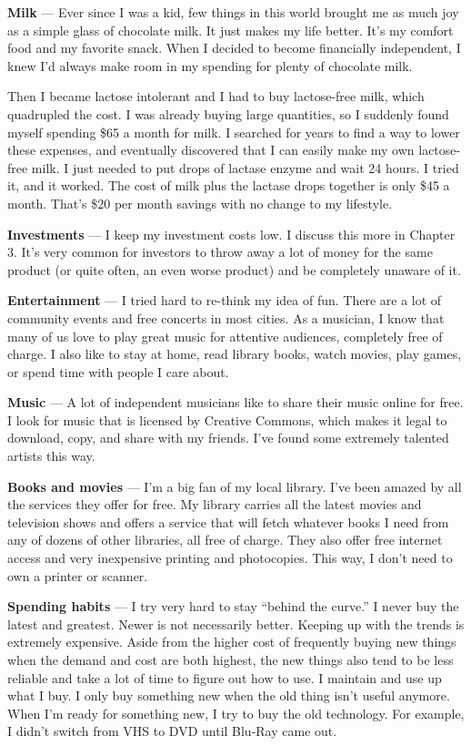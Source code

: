 \textbf{Milk} --- Ever since I was a kid, few things in this world brought me as much joy as a simple glass of chocolate milk. It just makes my life better. It's my comfort food and my favorite snack. When I decided to become financially independent, I knew I'd always make room in my spending for plenty of chocolate milk.

Then I became lactose intolerant and I had to buy lactose-free milk, which quadrupled the cost. I was already buying large quantities, so I suddenly found myself spending \$65 a month for milk. I searched for years to find a way to lower these expenses, and eventually discovered that I can easily make my own lactose-free milk. I just needed to put drops of lactase enzyme and wait 24 hours. I tried it, and it worked. The cost of milk plus the lactase drops together is only \$45 a month. That's \$20 per month savings with no change to my lifestyle.

\textbf{Investments} --- I keep my investment costs low. I discuss this more in Chapter 3. It's very common for investors to throw away a lot of money for the same product (or quite often, an even worse product) and be completely unaware of it.

\textbf{Entertainment} --- I tried hard to re-think my idea of fun. There are a lot of community events and free concerts in most cities. As a musician, I know that many of us love to play great music for attentive audiences, completely free of charge. I also like to stay at home, read library books, watch movies, play games, or spend time with people I care about.

\textbf{Music} --- A lot of independent musicians like to share their music online for free. I look for music that is licensed by Creative Commons, which makes it legal to download, copy, and share with my friends. I've found some extremely talented artists this way.

\textbf{Books and movies} --- I'm a big fan of my local library. I've been amazed by all the services they offer for free. My library carries all the latest movies and television shows and offers a service that will fetch whatever books I need from any of dozens of other libraries, all free of charge. They also offer free internet access and very inexpensive printing and photocopies. This way, I don't need to own a printer or scanner.

\textbf{Spending habits} --- I try very hard to stay ``behind the curve.'' I never buy the latest and greatest. Newer is not necessarily better. Keeping up with the trends is extremely expensive. Aside from the higher cost of frequently buying new things when the demand and cost are both highest, the new things also tend to be less reliable and take a lot of time to figure out how to use. I maintain and use up what I buy. I only buy something new when the old thing isn't useful anymore. When I'm ready for something new, I try to buy the old technology. For example, I didn't switch from VHS to DVD until Blu-Ray came out.

